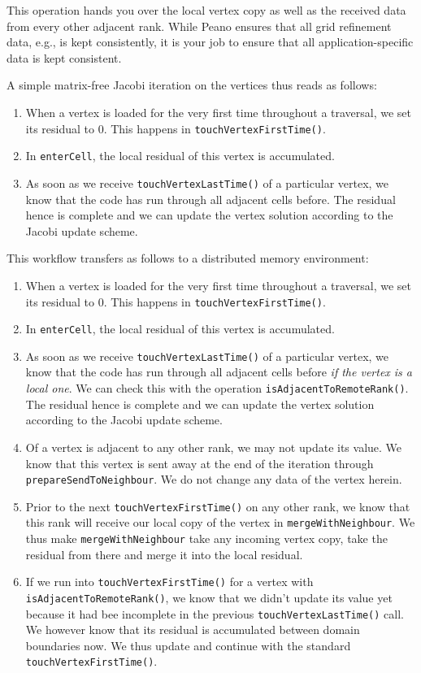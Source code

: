 \noindent
This operation hands you over the local vertex copy as well as the received data
from every other adjacent rank.
While Peano ensures that all grid refinement data, e.g., is kept consistently,
it is your job to ensure that all application-specific data is kept consistent.

A simple matrix-free Jacobi iteration on the vertices thus reads as follows:
\begin{enumerate}
  \item When a vertex is loaded for the very first time throughout a traversal,
  we set its residual to $0$. This happens in \texttt{touchVertexFirstTime()}.
  \item In \texttt{enterCell}, the local residual of this vertex is accumulated.
  \item As soon as we receive \texttt{touchVertexLastTime()} of a particular
  vertex, we know that the code has run through all adjacent cells before. The
  residual hence is complete and we can update the vertex solution according to
  the Jacobi update scheme.
\end{enumerate}

\noindent
This workflow transfers as follows to a distributed memory environment:
\begin{enumerate}
  \item When a vertex is loaded for the very first time throughout a traversal,
  we set its residual to $0$. This happens in \texttt{touchVertexFirstTime()}.
  \item In \texttt{enterCell}, the local residual of this vertex is accumulated.
  \item As soon as we receive \texttt{touchVertexLastTime()} of a particular
  vertex, we know that the code has run through all adjacent cells before {\em
  if the vertex is  a local one}. We can check this with the operation
  \texttt{isAdjacentToRemoteRank()}. The residual hence is complete and we can update the
  vertex solution according to the Jacobi update scheme.
  \item Of a vertex is adjacent to any other rank, we may not update its value.
  We know that this vertex is sent away at the end of the iteration through 
  \texttt{prepareSendToNeighbour}. We do not change any data of the vertex
  herein.
  \item Prior to the next \texttt{touchVertexFirstTime()} on any other rank, we
  know that this rank will receive our local copy of the vertex in
  \texttt{mergeWithNeighbour}. We thus make \texttt{mergeWithNeighbour} take any
  incoming vertex copy, take the residual from there and merge it into the local
  residual.
  \item If we run into \texttt{touchVertexFirstTime()} for a vertex with
  \texttt{isAdjacentToRemoteRank()}, we know that we didn't update its value yet
  because it had bee incomplete in the previous \texttt{touchVertexLastTime()}
  call. We however know that its residual is accumulated between domain
  boundaries now. We thus update and continue with the standard
  \texttt{touchVertexFirstTime()}.
\end{enumerate}



